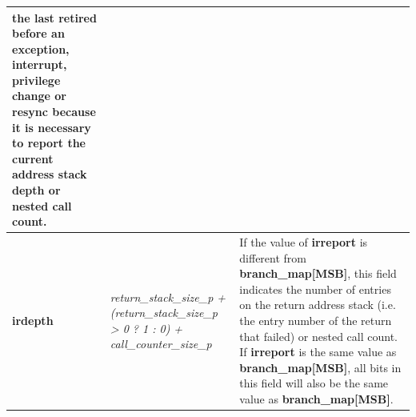 \begin{table}[htp]
\begin{tabulary}{\textwidth}{|l|p{35mm}|p{90mm}|}
                the last retired before an exception, interrupt, privilege change or resync because it is necessary to report 
                the current address stack depth or nested call count. \\
    \hline
    \textbf{irdepth}	& \textit {return\_stack\_size\_p + (return\_stack\_size\_p > 0 ? 1 : 0) + call\_counter\_size\_p} & 
                If the value of \textbf{irreport} is different from \textbf{branch\_map[MSB]}, this field 
		indicates the number of entries on the return address stack (i.e. the entry number of the return that
                failed) or nested call count.  If \textbf{irreport} is the same value as \textbf{branch\_map[MSB]}, 
                all bits in this field  will also be the same value as \textbf{branch\_map[MSB]}. \\
    \hline
  \end{tabulary}
\end{table}

